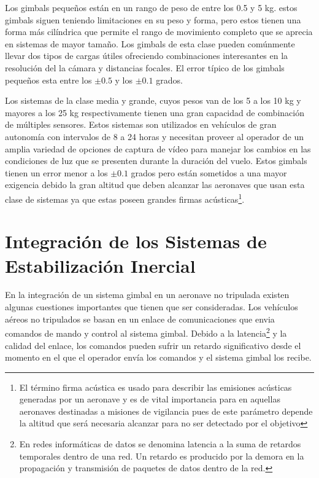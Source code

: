 Los gimbals peque\~{n}os est\'{a}n en un rango de peso de entre los 0.5 y 5 kg. estos gimbals siguen teniendo limitaciones en su peso y forma, pero estos tienen una forma m\'{a}s cil\'{i}ndrica que permite el rango de movimiento completo que se aprecia en sistemas de mayor tama\~{n}o. Los gimbals de esta clase pueden com\'{u}nmente llevar dos tipos de cargas \'{u}tiles ofreciendo combinaciones interesantes en la resoluci\'{o}n del la c\'{a}mara y distancias focales. El error t\'{i}pico de los gimbals peque\~{n}os esta entre los $\pm0.5$ y los $\pm0.1$ grados.

Los sistemas de la clase media y grande, cuyos pesos van de los 5 a los 10 kg y mayores a los 25 kg respectivamente tienen una gran capacidad de combinaci\'{o}n de m\'{u}ltiples sensores. Estos sistemas son utilizados en veh\'{i}culos de gran autonom\'{i}a con intervalos de 8 a 24 horas y necesitan proveer al operador de un amplia variedad de opciones de captura de v\'{i}deo para manejar los cambios en las condiciones de luz que se presenten durante la duraci\'{o}n del vuelo. Estos gimbals tienen un error menor a los $\pm0.1$ grados pero est\'{a}n sometidos a una mayor exigencia debido la gran altitud que deben alcanzar las aeronaves que usan esta clase de sistemas ya que estas poseen grandes firmas ac\'{u}sticas\footnote{El t\'{e}rmino firma ac\'{u}stica es usado para describir las emisiones ac\'{u}sticas generadas por un aeronave y es de vital importancia para en aquellas aeronaves destinadas a misiones de vigilancia pues de este par\'{a}metro depende la altitud que ser\'{a} necesaria alcanzar para no ser detectado por el objetivo}.

\section{Integraci\'{o}n de los Sistemas de Estabilizaci\'{o}n Inercial}

En la integraci\'{o}n de un sistema gimbal en un aeronave no tripulada existen algunas cuestiones importantes que tienen que ser consideradas. Los veh\'{i}culos a\'{e}reos no tripulados se basan en un enlace de comunicaciones que envia comandos de mando y control al sistema gimbal. Debido a la latencia\footnote{En redes inform\'{a}ticas de datos se denomina latencia a la suma de retardos temporales dentro de una red. Un retardo es producido por la demora en la propagaci\'{o}n y transmisi\'{o}n de paquetes de datos dentro de la red.} y la calidad del enlace, los comandos pueden sufrir un retardo significativo desde el momento en el que el operador env\'{i}a los comandos y el sistema gimbal los recibe. 

